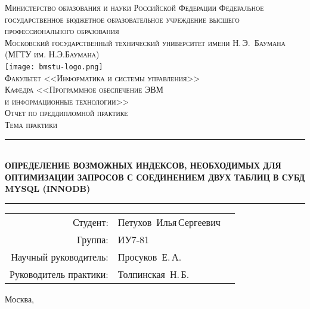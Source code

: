 \newcommand{\HRule}{\rule{\linewidth}{0.5mm}}

\begin{center}

\textsc{Министерство образования и науки Российской Федерации
Федеральное государственное бюджетное образовательное учреждение 
высшего профессионального образования}\\[0.5cm]

\textsc{\large Московский государственный технический университет имени Н.\,Э.~Баумана}\\
\textsc{(МГТУ им. Н.Э.Баумана)}\\[0.5cm]
\texttt{[image: bmstu-logo.png]}~\\

\textsc{Факультет <<Информатика и системы управления>>}\\
\textsc{Кафедра <<Программное обеспечение ЭВМ\\и информационные технологии>>}\\[1cm]




\textsc{\large Отчет по преддипломной практике}\\
\textsc{Тема практики}

\HRule 
{\bfseries \\ОПРЕДЕЛЕНИЕ ВОЗМОЖНЫХ ИНДЕКСОВ, НЕОБХОДИМЫХ ДЛЯ ОПТИМИЗАЦИИ ЗАПРОСОВ С СОЕДИНЕНИЕМ ДВУХ ТАБЛИЦ В СУБД MYSQL (INNODB)}
\HRule

\vfill

\begin{flushright}
  \begin{tabular}{rlc}
    Студент:  & Петухов~Илья\,Сергеевич  & \\[1cm]
    Группа: & ИУ7-81 & \\[1cm]
    Научный руководитель: & Просуков~Е.\,А. & \underline{\hspace{3cm}} \\[1cm]
    Руководитель практики: & Толпинская~Н.\,Б. & \underline{\hspace{3cm}} \\[1cm]
  \end{tabular}
\end{flushright}

{\large Москва, \the\year}

\end{center}

\newpage
{}